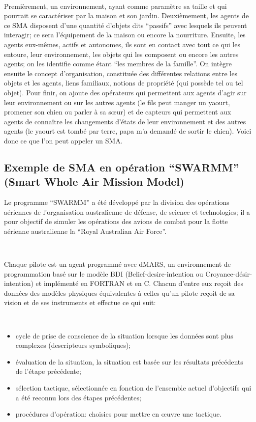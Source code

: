 ~\par
Premièrement, un environnement, ayant comme paramètre sa taille et qui pourrait se caractériser par la maison et son jardin. Deuxièmement, les agents de ce SMA disposent d’une quantité d’objets dits “passifs” avec lesquels ils peuvent interagir; ce sera l’équipement de la maison ou encore la nourriture. Ensuite, les agents eux-mêmes, actifs et autonomes, ils sont en contact avec tout ce qui les entoure, leur environnement, les objets qui les composent ou encore les autres agents; on les identifie comme étant “les membres de la famille”. On intègre ensuite le concept d’organisation, constituée des différentes relations entre les objets et les agents, liens familiaux, notions de propriété (qui possède tel ou tel objet). Pour finir, on ajoute des opérateurs qui permettent aux agents d’agir sur leur environnement ou sur les autres agents (le fils peut manger un yaourt, promener son chien ou parler à sa sœur) et de capteurs qui permettent aux agents de connaître les changements d'états de leur environnement et des autres agents (le yaourt est tombé par terre, papa m'a demandé de sortir le chien). Voici donc ce que l'on peut appeler un SMA. \parencite{sma}


\subsection{Exemple de SMA en opération “SWARMM” (Smart Whole Air Mission Model)} \label{ssec:swarm}

Le  programme “SWARMM” a été développé par la division des opérations aériennes de l’organisation australienne de défense, de science et technologies; il a  pour objectif de simuler les opérations des avions de combat pour la flotte aérienne australienne la “Royal Australian Air Force”.

~\par
Chaque pilote est un agent programmé avec dMARS, un environnement de programmation basé sur le modèle BDI (Belief-desire-intention ou Croyance-désir-intention) et implémenté en FORTRAN et en C. Chacun d'entre eux reçoit des données des modèles physiques équivalentes à celles qu'un pilote reçoit de sa vision et de ses instruments et effectue ce qui suit:

~\par
\begin{itemize}
\item cycle de prise de conscience de la situation lorsque les données sont plus complexes (descripteurs symboliques);
\item  évaluation de la situation, la situation est basée sur les résultats précédents de l'étape précédente;
\item sélection tactique, sélectionnée en fonction de l'ensemble actuel d'objectifs qui a été reconnu lors des étapes précédentes;
\item procédures d'opération: choisies pour mettre en œuvre une tactique.
\end{itemize}

